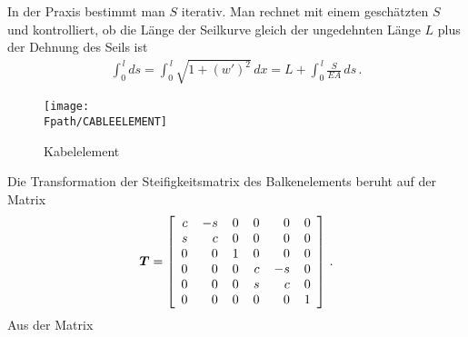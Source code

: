 \efo
In der Praxis bestimmt man $S$ iterativ. Man rechnet mit einem gesch\"{a}tzten $S$ und kontrolliert, ob die L\"{a}nge der Seilkurve gleich der ungedehnten L\"{a}nge $L$ plus der Dehnung des Seils ist
\begin{align}
\int_0^{\,l} ds  = \int_0^{\,l} \sqrt{1 + (w')^2}\,dx = L + \int_0^{\,l} \frac{S}{EA}\,ds\,.
\end{align}
\begin{figure}[tbp]
\centering
\if {} \sidecaption \fi
\texttt{[image: \\Fpath/CABLEELEMENT]}
\caption{Kabelelement}
\label{CableElement}%
\end{figure}%
Die Transformation der Steifigkeitsmatrix des Balkenelements beruht auf der Matrix
\begin{align}\label{Eq72}
\vek T =
\left[\barr{r @{\hspace{4mm}}r @{\hspace{4mm}}r @{\hspace{4mm}}r @{\hspace{4mm}}r @{\hspace{4mm}}r} c &-s & 0 & 0 & 0 &0\\
s & c & 0 & 0 & 0 &0\\
0 & 0 & 1 & 0 & 0 &0\\
0 & 0 & 0 & c &-s &0\\
0 & 0 & 0 & s & c &0\\
0 & 0 & 0 & 0 & 0 &1
\earr \right]\,.
\end{align}
Aus der Matrix
